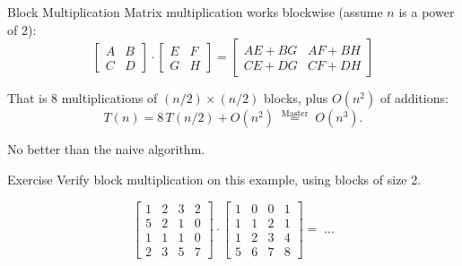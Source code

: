 \documentclass[10pt,aspectratio=169]{beamer}
\begin{document}
\begin{frame}{Block Multiplication}
  Matrix multiplication works \alert{blockwise} (assume $n$ is a power of 2):
  \[
    \begin{bmatrix} A & B \\ C & D \end{bmatrix}
    \cdot
    \begin{bmatrix} E & F \\ G & H \end{bmatrix}
    =
    \begin{bmatrix} AE + BG & AF + BH \\ CE + DG & CF + DH \end{bmatrix}
  \]

  \bigskip
  That is \alert{8} multiplications of $(n/2) \times (n/2)$ blocks, plus $O(n^2)$ of additions:
  \[
    T(n) = 8\,T(n/2) + O(n^2)
    \;\overset{\text{Master}}{=}\; O(n^3).
  \]

  \bigskip
  \begin{center}
    No better than the naive algorithm.
  \end{center}
\end{frame}

\begin{frame}{Exercise}
  Verify block multiplication on this example, using blocks of size 2.

  \bigskip
  \[
    \begin{bmatrix}
      1 & 2 & 3 & 2\\
      5 & 2 & 1 & 0 \\
      1 & 1 & 1 & 0 \\
      2 & 3 & 5 & 7
    \end{bmatrix}
    \cdot
    \begin{bmatrix}
      1 & 0 & 0 & 1\\
      1 & 1 & 2 & 1 \\
      1 & 2 & 3 & 4 \\
      5 & 6 & 7 & 8
    \end{bmatrix}
    = \; \ldots
  \]
\end{frame}
\end{document}
